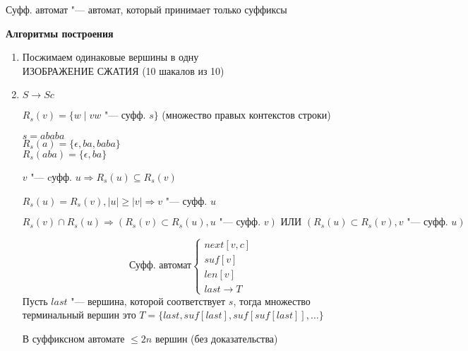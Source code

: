 \begin{Def}
	Суфф. автомат "--- автомат, который принимает только суффиксы
\end{Def}

\textbf{Алгоритмы построения}
\begin{enumerate}
	\item
		Посжимаем одинаковые вершины в одну \\
		ИЗОБРАЖЕНИЕ СЖАТИЯ (10 шакалов из 10)
	\item
		$S \to Sc$
		\begin{Def}
			$R_s(v) = \{ w \mid vw$ "--- суфф. $s \}$ (множество правых контекстов строки) 
		\end{Def}
		\begin{exmp}
			$s = ababa$ \\
			$R_s(a) = \{\epsilon, ba, baba \}$ \\
			$R_s(aba) = \{\epsilon, ba \}$
		\end{exmp}
		\begin{lemma}
			$v$ "--- cуфф. $u \Rightarrow R_s(u) \subseteq R_s(v)$
		\end{lemma}
		\begin{lemma}
			$R_s(u) = R_s(v), |u| \geqslant |v| \Rightarrow v$ "--- суфф. $u$
		\end{lemma}
		\begin{lemma}
			$R_s(v) \cap R_s(u) \Rightarrow (R_s(v) \subset R_s(u), \text{$u$ "--- суфф. $v$}) \text{ ИЛИ } (R_s(u) \subset R_s(v), \text{$v$ "--- суфф. $u$})$
		\end{lemma}
		\begin{equation*}
		\text{Суфф. автомат}
		\begin{cases}
			next[v,c] \\
			suf[v] \\
			len[v] \\
			last \to T
			 
		\end{cases}
	\end{equation*}
	Пусть $last$ "--- вершина, которой соответствует $s$, тогда множество терминальный вершин это $T = \{last, suf[last], suf[suf[last]], \dots \}$
	\begin{lemma}
		В суффиксном автомате $\leqslant 2n$ вершин (без доказательства) 
	\end{lemma}
\end{enumerate}